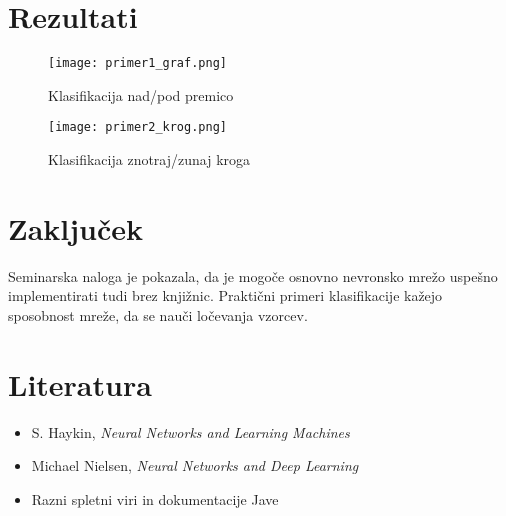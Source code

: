 \documentclass[12pt,a4paper]{article}
\begin{document}
\section{Rezultati}
\begin{figure}[H]
\centering
\texttt{[image: primer1\_graf.png]}
\caption{Klasifikacija nad/pod premico}
\end{figure}

\begin{figure}[H]
\centering
\texttt{[image: primer2\_krog.png]}
\caption{Klasifikacija znotraj/zunaj kroga}
\end{figure}

\section{Zaključek}
Seminarska naloga je pokazala, da je mogoče osnovno nevronsko mrežo uspešno implementirati tudi brez knjižnic. Praktični primeri klasifikacije kažejo sposobnost mreže, da se nauči ločevanja vzorcev.

\section{Literatura}
\begin{itemize}
    \item S. Haykin, \textit{Neural Networks and Learning Machines}
    \item Michael Nielsen, \textit{Neural Networks and Deep Learning}
    \item Razni spletni viri in dokumentacije Jave
\end{itemize}
\end{document}
